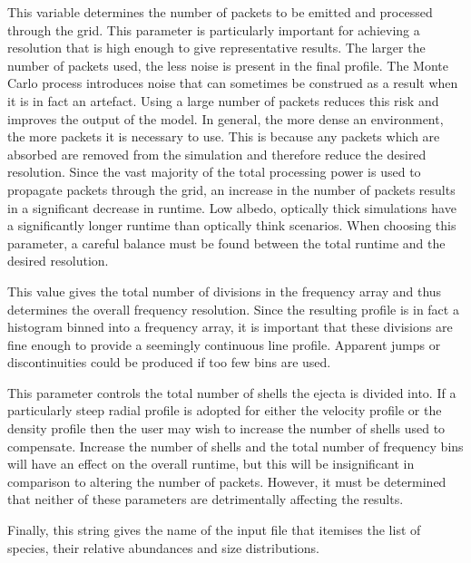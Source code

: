 This variable determines the number of packets to be emitted and processed through the grid.  This parameter is particularly important for achieving a resolution that is high enough to give representative results.  The larger the number of packets used, the less noise is present in the final profile.  The Monte Carlo process introduces noise that can sometimes be construed as a result when it is in fact an artefact.  Using a large number of packets reduces this risk and improves the output of the model.  In general, the more dense an environment, the more packets it is necessary to use.  This is because any packets which are absorbed are removed from the simulation and therefore reduce the desired resolution.  Since the vast majority of the total processing power is used to propagate packets through the grid, an increase in the number of packets results in a significant decrease in runtime. Low albedo, optically thick simulations have a significantly longer runtime than optically think scenarios.  When choosing this parameter, a careful balance must be found between the total runtime and the desired resolution. 



This value gives the total number of divisions in the frequency array and thus determines the overall frequency resolution.  Since the resulting profile is in fact a histogram binned into a frequency array, it is important that these divisions are fine enough to provide a seemingly continuous line profile.  Apparent jumps or discontinuities could be produced if too few bins are used.


This parameter controls the total number of shells the ejecta is divided into.  If a particularly steep radial profile is adopted for either the velocity profile or the density profile then the user may wish to increase the number of shells used to compensate.  Increase the number of shells and the total number of frequency bins will have an effect on the overall runtime, but this will be insignificant in comparison to altering the number of packets.  However, it must be determined that neither of these parameters are detrimentally affecting the results.



Finally, this string gives the name of the input file that itemises the list of species, their relative abundances and size distributions.

